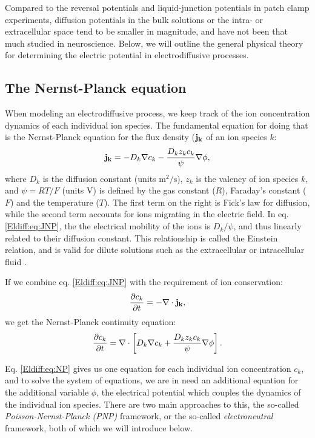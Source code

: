 Compared to the reversal potentials and liquid-junction potentials in patch clamp experiments, 
diffusion potentials in the bulk solutions or the intra- or extracellular space tend to be smaller in magnitude, and have not been that much studied in neuroscience. Below, we will outline the general physical theory for determining the electric potential in electrodiffusive processes.


\subsection{The Nernst-Planck equation}
\label{sec:Eldiff:NP}
When modeling an electrodiffusive process, we keep track of the ion concentration dynamics of each individual ion species. The fundamental equation for doing that is the Nernst-Planck equation for the flux density (${\bf j_k}$ of an ion species $k$:
\begin{equation}
{\bf j_k} = - D_k {\bf \nabla} c_{k} - \frac{D_k z_k c_k}{\psi} {\bf \nabla} \phi, 
\label{Eldiff:eq:eq:JNP}
\end{equation}
where ${D}_k$ is the diffusion constant (units $\mathrm{m^2/s}$), $z_{k}$ is the valency of ion species $k$, and $\psi=RT/F$ (units V) is defined by the gas constant ($R$), Faraday's constant ($F$) and the temperature ($T$). The first term on the right is Fick's law for diffusion, while the second term accounts for ions migrating in the electric field.  In eq. \ref{Eldiff:eq:JNP}, the the electrical mobility of the ions is $D_k/\psi$, and thus linearly related to their diffusion constant. This relationship is called the Einstein relation, and is valid for dilute solutions such as the extracellular or intracellular fluid \citep{Grodzinsky2011}.

If we combine eq. \ref{Eldiff:eq:JNP} with the requirement of ion conservation:
\begin{equation}
\frac{\partial c_k}{\partial t} = -\nabla \cdot {\bf j_k},
\label{Eldiff:eq:general_ionconservation}
\end{equation}
we get the Nernst-Planck continuity equation:
\begin{equation}
\frac{\partial c_k}{\partial t} = {\bf \nabla} \cdot \left[{D_k} {\bf \nabla} c_k + \frac{D_k z_k c_k}{\psi}{\bf \nabla} \phi \right].
\label{Eldiff:eq:NP}
\end{equation}

Eq. \ref{Eldiff:eq:NP} gives us one equation for each individual ion concentration $c_k$, and to solve the system of equations, we are in need an additional equation for the additional variable $\phi$, the electrical potential which couples the dynamics of the individual ion species. There are two main approaches to this, the so-called \textit{Poisson-Nernst-Planck (PNP)} framework, or the so-called \textit{electroneutral} framework, both of which we will introduce below. 


